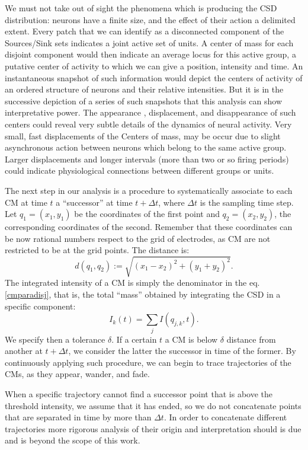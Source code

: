 \documentclass[11pt, letterpaper]{article}
\begin{document}
We must not take out of sight the phenomena which is producing the CSD distribution:
neurons have a finite size, and the effect of their action a delimited extent.
Every patch that we can identify as a disconnected component of the Sources/Sink
sets indicates a  joint active set of units. A center of mass for each disjoint
component would then indicate an average locus for this active group, a putative center of activity to which we can give a position, intensity and time. An instantaneous snapshot of such information would depict the centers of activity of an ordered structure of neurons and their relative intensities. But it is in the successive depiction of a series of such snapshots that this analysis can show interpretative power. The appearance , displacement, and disappearance of such centers could reveal very subtle details of the dynamics of neural activity. Very small, fast displacements of the Centers of mass, may be occur due to slight asynchronous action between neurons which belong to the same active group.
Larger displacements and  longer intervals (more than two or so firing periods)
could indicate physiological connections between different groups or units.

The next step in our analysis is a procedure to systematically associate to each CM
at time $t$ a ``successor'' at time $t+\Delta t$, where $\Delta t$ is the sampling
time step. Let $q_1=(x_1, y_1)$ be the coordinates of the first point and $q_2=(x_2,y_2)$,
the corresponding coordinates of the second.
Remember that these coordinates can be now
rational numbers
respect to the grid of electrodes,
as CM are not restricted to be  at the grid points.
The distance is:
\begin{equation}
d(q_1,q_2):=\sqrt{(x_1-x_2)^2+(y_1+y_2)^2}.
\end{equation}
The integrated intensity of a CM is simply the denominator in the
eq. \ref{cmparadisj},
that is, the total ``mass'' obtained by integrating the CSD in a specific component:
\begin{equation}
  I_k(t)=\sum_j I (q_{j,k}, t).
\end{equation}
We specify then a tolerance $\delta$. If a certain $t$ a CM is below $\delta$ distance from another at $t+\Delta t$, we consider the latter the successor in time of the former. By continuously applying such procedure, we can begin to trace trajectories of the CMs, as they appear, wander, and fade. 

When a specific trajectory cannot find a successor point that is above the
threshold intensity, we assume that it has ended, so we do not concatenate
points that are separated in time by more than $\Delta t$.
In order to concatenate different
trajectories more rigorous analysis of their origin and interpretation
should is due and is beyond the scope of this work.
\end{document}
